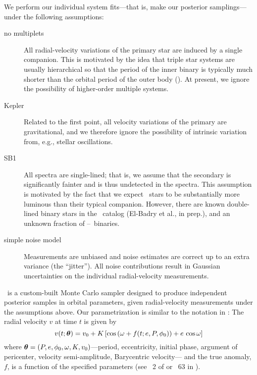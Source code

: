 \documentclass[modern, letterpaper]{aastex61}
\newcommand{\apogee}{\project{\acronym{APOGEE}}}
\newcommand{\thejoker}{\project{The~Joker}}
\newcommand{\RGB}{\acronym{RGB}}
\begin{document}
We perform our individual system fits---that is, make our posterior
samplings---under the following assumptions:
\begin{description}
\item[no multiplets] All radial-velocity variations of the primary star are
  induced by a single companion.
  This is motivated by the idea that triple star systems are usually
  hierarchical so that the period of the inner binary is typically much shorter
  than the orbital period of the outer body ().
  At present, we ignore the possibility of higher-order multiple systems.
\item[Kepler] Related to the first point, all velocity variations of the primary
  are gravitational, and we therefore ignore the possibility of intrinsic
  variation from, e.g., stellar oscillations.
\item[SB1] All spectra are single-lined; that is, we assume that the secondary
  is significantly fainter and is thus undetected in the spectra.
  This assumption is motivated by the fact that we expect \RGB\ stars to be
  substantially more luminous than their typical companion.
  However, there are known double-lined binary stars in the \apogee\ catalog
  (El-Badry et al., in prep.), and an unknown fraction of \RGB--\RGB\ binaries.
\item[simple noise model] Measurements are unbiased and noise estimates are
  correct up to an  extra variance (the ``jitter'').
  All noise contributions result in Gaussian uncertainties on the individual
  radial-velocity measurements.
\end{description}

\thejoker\ is a custom-built Monte Carlo sampler designed to produce independent
posterior samples in orbital parameters, given radial-velocity measurements
under the assumptions above.
Our parametrization is similar to the notation in \citet{Murray:2010}:
The radial velocity $v$ at time $t$ is given by
\begin{equation}
  v(t;\bs{\theta}) = v_0 + K\,[\cos\left(\omega + f(t; e, P, \phi_0)\right) +
    e\,\cos\omega]
\end{equation}
where $\boldsymbol{\theta} = (P,e,\phi_0,\omega,K,v_0)$---period, eccentricity, initial
phase, argument of pericenter, velocity semi-amplitude, Barycentric velocity---
and the true anomaly, $f$, is a function of the specified parameters (see
\sectionname~2 of \citealt{Price-Whelan:2017} or \eqname~63 in
\citealt{Murray:2010}).
\end{document}
